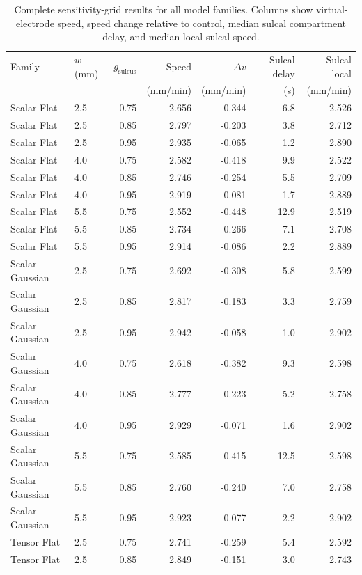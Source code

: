 \begin{table}[htbp]
\centering
\caption{Complete sensitivity-grid results for all model families. Columns show virtual-electrode speed, speed change relative to control, median sulcal compartment delay, and median local sulcal speed.}
\label{tab:full_grid}
\small
\begin{tabular}{@{}llrrrrr@{}}
\toprule
Family & $w$ (mm) & $g_{\mathrm{sulcus}}$ & Speed & $\Delta v$ & Sulcal delay & Sulcal local \\
 & & & (mm/min) & (mm/min) & (s) & (mm/min) \\
\midrule
Scalar Flat & 2.5 & 0.75 & 2.656 & -0.344 & 6.8 & 2.526 \\
Scalar Flat & 2.5 & 0.85 & 2.797 & -0.203 & 3.8 & 2.712 \\
Scalar Flat & 2.5 & 0.95 & 2.935 & -0.065 & 1.2 & 2.890 \\
Scalar Flat & 4.0 & 0.75 & 2.582 & -0.418 & 9.9 & 2.522 \\
Scalar Flat & 4.0 & 0.85 & 2.746 & -0.254 & 5.5 & 2.709 \\
Scalar Flat & 4.0 & 0.95 & 2.919 & -0.081 & 1.7 & 2.889 \\
Scalar Flat & 5.5 & 0.75 & 2.552 & -0.448 & 12.9 & 2.519 \\
Scalar Flat & 5.5 & 0.85 & 2.734 & -0.266 & 7.1 & 2.708 \\
Scalar Flat & 5.5 & 0.95 & 2.914 & -0.086 & 2.2 & 2.889 \\
Scalar Gaussian & 2.5 & 0.75 & 2.692 & -0.308 & 5.8 & 2.599 \\
Scalar Gaussian & 2.5 & 0.85 & 2.817 & -0.183 & 3.3 & 2.759 \\
Scalar Gaussian & 2.5 & 0.95 & 2.942 & -0.058 & 1.0 & 2.902 \\
Scalar Gaussian & 4.0 & 0.75 & 2.618 & -0.382 & 9.3 & 2.598 \\
Scalar Gaussian & 4.0 & 0.85 & 2.777 & -0.223 & 5.2 & 2.758 \\
Scalar Gaussian & 4.0 & 0.95 & 2.929 & -0.071 & 1.6 & 2.902 \\
Scalar Gaussian & 5.5 & 0.75 & 2.585 & -0.415 & 12.5 & 2.598 \\
Scalar Gaussian & 5.5 & 0.85 & 2.760 & -0.240 & 7.0 & 2.758 \\
Scalar Gaussian & 5.5 & 0.95 & 2.923 & -0.077 & 2.2 & 2.902 \\
Tensor Flat & 2.5 & 0.75 & 2.741 & -0.259 & 5.4 & 2.592 \\
Tensor Flat & 2.5 & 0.85 & 2.849 & -0.151 & 3.0 & 2.743 \\

\end{tabular}
\end{table}
